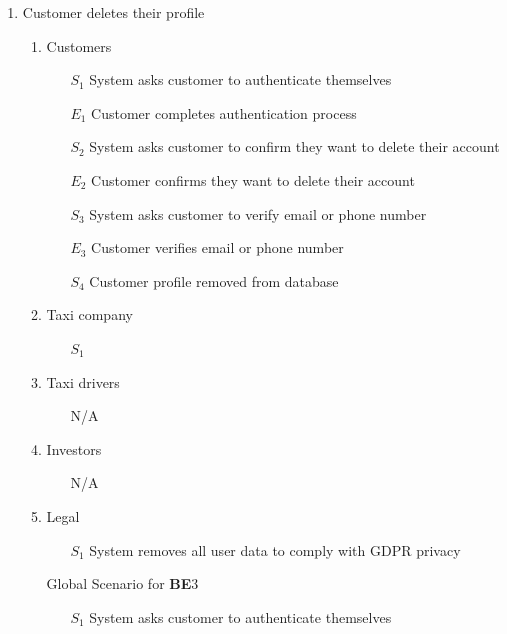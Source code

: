 \documentclass[]{article}
\begin{document}
\begin{enumerate}[{\textbf{BE}}1.]
\item Customer deletes their profile
    \begin{enumerate}[{\textbf{VP3}}.1]
        \item Customers
            \begin{enumerate}
                  	 \item[$S_1$] System asks customer to authenticate themselves	
                   	 \item[$E_1$] Customer completes authentication process
			\item[$S_2$] System asks customer to confirm they want to delete their account
                   \item[$E_2$] Customer confirms they want to delete their account
\color{blue}
                \item[$S_3$] System asks customer to verify email or phone number
                \item[$E_3$] Customer verifies email or phone number
\color{black}
                \item[$S_4$] Customer profile removed from database
            \end{enumerate}
        \item Taxi company
            \begin{enumerate}
                \item[$S_1$] 
            \end{enumerate}
        \item Taxi drivers
            \begin{enumerate}
                \item[N/A]
            \end{enumerate}
        \item Investors
            \begin{enumerate}
                \item[N/A]
            \end{enumerate}
        \item Legal
            \begin{enumerate}
                \item[$S_1$] System removes all user data to comply with GDPR privacy
            \end{enumerate}
        \item[Global] Scenario for \textbf{BE}3
            \begin{enumerate}
                  	 \item[$S_1$] System asks customer to authenticate themselves	

\end{enumerate}
\end{enumerate}
\end{enumerate}
\end{document}
